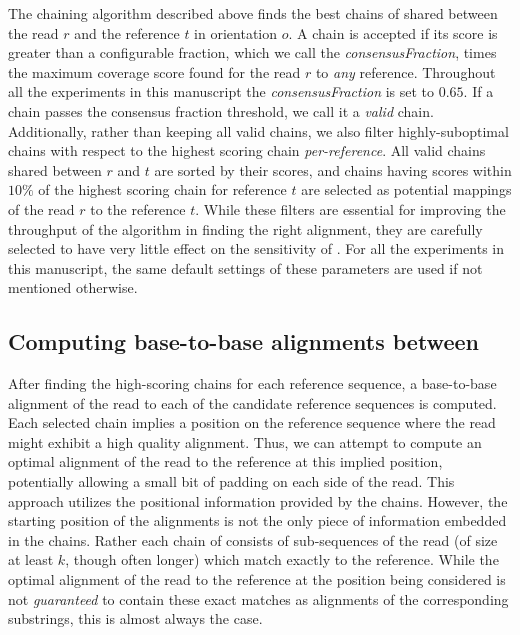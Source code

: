 The chaining algorithm described above finds the best chains of \mems
shared between the read $r$ and the reference $t$ in orientation $o$.
A chain is accepted if its score is greater than a
configurable fraction, which we call the \textit{consensusFraction},
times the maximum coverage score found for the read $r$ to \emph{any}
reference. Throughout all the experiments in this manuscript the
\textit{consensusFraction} is set to $0.65$. If a chain passes the
consensus fraction threshold, we call it a \emph{valid} chain.
Additionally, rather than keeping all valid chains, we also filter
highly-suboptimal chains with respect to the highest scoring chain
\emph{per-reference}. All valid chains shared between $r$ and $t$ are sorted
by their scores, and chains having scores within $10\%$ 
of the highest scoring chain for reference $t$ are selected as
potential mappings of the read $r$ to the reference $t$. While these
filters are essential for improving the throughput of the algorithm
in finding the right alignment, they are carefully selected to have
very little effect on the sensitivity of \puffaligner. For
all the experiments in this manuscript, the same default settings of
these parameters are used if not mentioned otherwise.

\subsection{Computing base-to-base alignments between \mems}
\label{subsec:base-to-base}
After finding the high-scoring \mem chains for each reference
sequence, a base-to-base alignment of the read to each of the
candidate reference sequences is computed. Each selected chain
implies a position on the reference sequence where the read might
exhibit a high quality alignment. Thus, we can attempt to compute an
optimal alignment of the read to the reference at this implied
position, potentially allowing a small bit of padding on each side of
the read. This approach utilizes the positional information provided
by the \mem chains. However, the starting position of the alignments
is not the only piece of information embedded in the chains. Rather
each chain of \mems consists of sub-sequences of the read (of size at
least $k$, though often longer) which match exactly to the reference. While the optimal
alignment of the read to the reference at the position being
considered is not \emph{guaranteed} to contain these exact matches as
alignments of the corresponding substrings, this is almost always the
case.

